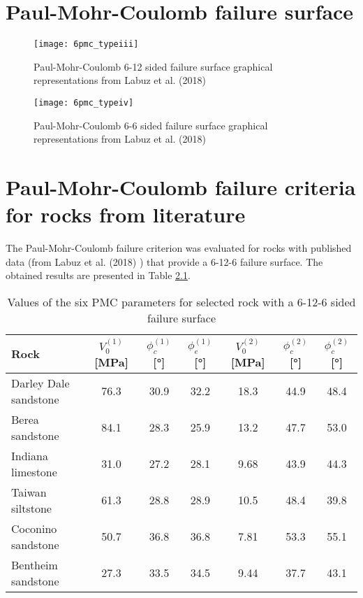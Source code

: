 \chapter{Paul-Mohr-Coulomb failure surface}\label{App:D}

\begin{figure}[!ht]
    \centering
    \texttt{[image: 6pmc\_typeiii]}
    \captionsetup{justification=centering}
    \caption{Paul-Mohr-Coulomb 6-12 sided failure surface graphical representations from Labuz et al. (2018) \cite{Labuz2018}}
    \label{fig5:6pmc_typeiii}
\end{figure}

\begin{figure}[!ht]
    \centering
    \texttt{[image: 6pmc\_typeiv]}
    \captionsetup{justification=centering}
    \caption{Paul-Mohr-Coulomb 6-6 sided failure surface graphical representations from Labuz et al. (2018) \cite{Labuz2018}}
    \label{fig5:6pmc_typeiv}
\end{figure}

\chapter{Paul-Mohr-Coulomb failure criteria for rocks from literature}\label{App:E}

The Paul-Mohr-Coulomb failure criterion was evaluated for rocks with published data (from Labuz et al. (2018) \cite{Labuz2018}) that provide a 6-12-6 failure surface. The obtained results are presented in Table \ref{AppE:litt_rock}.





\begin{table}[!ht]
    \centering 
    \captionsetup{justification=centering}
    \caption{Values of the six PMC parameters for selected rock with a 6-12-6 sided failure surface}
    \begin{tabular}{lcccccc}
        \hline
        Rock & $V_0^{(1)}$ [\si{\mega\pascal}] & $\phi_c^{(1)}$ [\si{\degree}] & $\phi_e^{(1)}$ [\si{\degree}] & $V_0^{(2)}$ [\si{\mega\pascal}] & $\phi_c^{(2)}$ [\si{\degree}] & $\phi_c^{(2)}$ [\si{\degree}]\\
        \hline
        \hline
        Darley Dale sandstone & 76.3 & 30.9 &  32.2 & 18.3 & 44.9 & 48.4 \\
        Berea sandstone & 84.1 & 28.3 &  25.9 & 13.2 & 47.7 & 53.0 \\
        Indiana limestone & 31.0 & 27.2 &  28.1 & 9.68 & 43.9 & 44.3 \\
        Taiwan siltstone & 61.3 & 28.8 &  28.9 & 10.5 & 48.4 & 39.8 \\
        Coconino sandstone & 50.7 & 36.8 &  36.8 & 7.81 & 53.3 & 55.1 \\
        Bentheim sandstone & 27.3 & 33.5 &  34.5 & 9.44 & 37.7 & 43.1 \\
    \end{tabular}
    \label{AppE:litt_rock}
\end{table}


